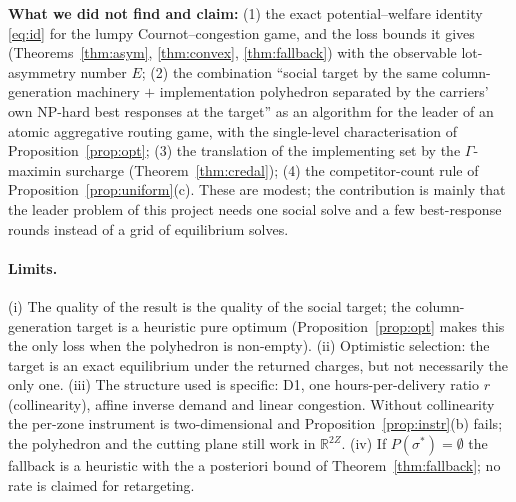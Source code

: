 \documentclass[11pt]{article}
\theoremstyle{definition}
\theoremstyle{remark}
\newcommand{\R}{\mathbb{R}}
\begin{document}
\textbf{What we did not find and claim:} (1) the exact potential--welfare identity \eqref{eq:id} for the lumpy Cournot--congestion game, and the loss bounds it gives (Theorems~\ref{thm:asym}, \ref{thm:convex}, \ref{thm:fallback}) with the observable lot-asymmetry number $E$; (2) the combination ``social target by the same column-generation machinery $+$ implementation polyhedron separated by the carriers' own NP-hard best responses at the target'' as an algorithm for the leader of an atomic aggregative routing game, with the single-level characterisation of Proposition~\ref{prop:opt}; (3) the translation of the implementing set by the $\Gamma$-maximin surcharge (Theorem~\ref{thm:credal}); (4) the competitor-count rule of Proposition~\ref{prop:uniform}(c). These are modest; the contribution is mainly that the leader problem of this project needs one social solve and a few best-response rounds instead of a grid of equilibrium solves.

\paragraph{Limits.} (i) The quality of the result is the quality of the social target; the column-generation target is a heuristic pure optimum (Proposition~\ref{prop:opt} makes this the only loss when the polyhedron is non-empty). (ii) Optimistic selection: the target is an exact equilibrium under the returned charges, but not necessarily the only one. (iii) The structure used is specific: D1, one hours-per-delivery ratio $r$ (collinearity), affine inverse demand and linear congestion. Without collinearity the per-zone instrument is two-dimensional and Proposition~\ref{prop:instr}(b) fails; the polyhedron and the cutting plane still work in $\R^{2Z}$. (iv) If $P(\sigma^*)=\emptyset$ the fallback is a heuristic with the a posteriori bound of Theorem~\ref{thm:fallback}; no rate is claimed for retargeting.
\end{document}
